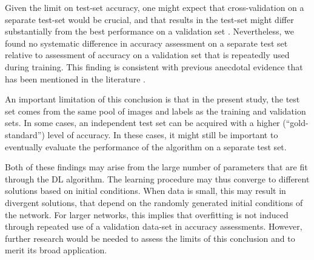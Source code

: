 Given the limit on test-set accuracy, one might expect that cross-validation on
a separate test-set would be crucial, and that results in the test-set might
differ substantially from the best performance on a validation set
\citep{Zhang_2017}. Nevertheless, we found no systematic difference in
accuracy assessment on a separate test set relative to assessment of accuracy on
a validation set that is repeatedly used during training. This finding is
consistent with previous anecdotal evidence that has been mentioned in the
literature \citep{Krizhevsky2012-qc}.

An important limitation of this conclusion is that in the present study, 
the test set comes from the same pool of images and labels as the training 
and validation sets. In some cases, an independent test set can be acquired 
with a higher (``gold-standard'') level of accuracy. In these cases, it might
still be important to eventually evaluate the performance of the algorithm 
on a separate test set. 

Both of these findings may arise from the large number of parameters that are
fit through the DL algorithm. The learning procedure may thus converge to
different solutions based on initial conditions. When data is small, this may
result in divergent solutions, that depend on the randomly generated initial
conditions of the network. For larger networks, this implies that overfitting is
not induced through repeated use of a validation data-set in accuracy
assessments. However, further research would be needed to assess the limits of
this conclusion and to merit its broad application.
